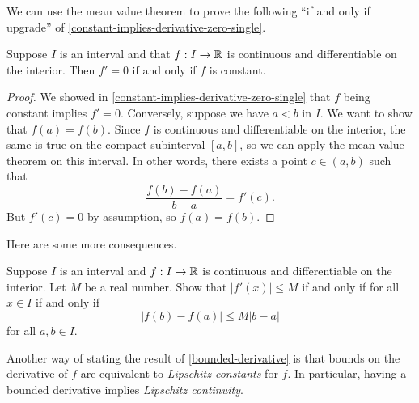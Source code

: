 We can use the mean value theorem to prove the following ``if and only if upgrade'' of \cref{constant-implies-derivative-zero-single}. 

\begin{proposition} \label{constant-iff-derivative-zero-single}
	Suppose $I$ is an interval and that $f : I \to \mathbb{R}$ is continuous and differentiable on the interior. Then $f' = 0$ if and only if $f$ is constant. 
\end{proposition}

\begin{proof}
	We showed in \cref{constant-implies-derivative-zero-single} that $f$ being constant implies $f' = 0$. Conversely, suppose we have $a < b$ in $I$. We want to show that $f(a) = f(b)$. Since $f$ is continuous and differentiable on the interior, the same is true on the compact subinterval $[a,b]$, so we can apply the mean value theorem on this interval. In other words, there exists a point $c \in (a,b)$ such that
	\[ \frac{f(b)-f(a)}{b-a} = f'(c). \]
	But $f'(c) = 0$ by assumption, so $f(a) = f(b)$. 
\end{proof}

Here are some more consequences. 

\begin{exercise} \label{bounded-derivative}
	Suppose $I$ is an interval and $f : I \to \mathbb{R}$ is continuous and differentiable on the interior. Let $M$ be a real number. Show that $|f'(x)| \leq M$ if and only if for all $x \in I$ if and only if \[ |f(b) - f(a)| \leq M|b-a| \] for all $a, b \in I$.
\end{exercise}

\begin{unimportantremark}
	Another way of stating the result of \cref{bounded-derivative} is that bounds on the derivative of $f$ are equivalent to \emph{Lipschitz constants} for $f$. In particular, having a bounded derivative implies \emph{Lipschitz continuity}. 
\end{unimportantremark}

